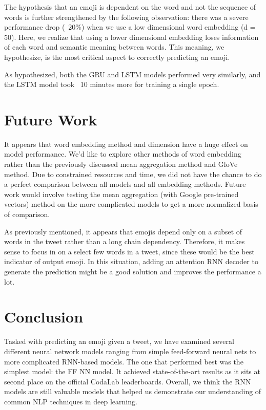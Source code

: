 \documentclass[11pt,a4paper]{article}
\begin{document}
	The hypothesis that an emoji is dependent on the word and not the sequence of words is further strengthened by the following observation: there was a severe performance drop (~20\%) when we use a low dimensional word embedding (d = 50). Here, we realize that using a lower dimensional embedding loses information of each word and semantic meaning between words. This meaning, we hypothesize, is the most critical aspect to correctly predicting an emoji.
	\par
	As hypothesized, both the GRU and LSTM models performed very similarly, and the LSTM model took ~10 minutes more for training a single epoch. 
\section{Future Work}
It appears that word embedding method and dimension have a huge effect on model performance. We’d like to explore other methods of word embedding rather than the previously discussed mean aggregation method and GloVe method. Due to constrained resources and time, we did not have the chance to do a perfect comparison between all models and all embedding methods. Future work would involve testing the mean aggregation (with Google pre-trained vectors) method on the more complicated models to get a more normalized basis of comparison.
\par
As previously mentioned, it appears that emojis depend only on a subset of words in the tweet rather than a long chain dependency. Therefore, it makes sense to focus in on a select few words in a tweet, since these would be the best indicator of output emoji. In this situation, adding an attention RNN decoder to generate the prediction might be a good solution and improves the performance a lot. 

\section{Conclusion}
Tasked with predicting an emoji given a tweet, we have examined several different neural network models ranging from simple feed-forward neural nets to more complicated RNN-based models. The one that performed best was the simplest model: the FF NN model. It achieved state-of-the-art results as it sits at second place on the official CodaLab leaderboards. Overall, we think the RNN models are still valuable models that helped us demonstrate our understanding of common NLP techniques in deep learning.

	

%
%
\nocite{*}





\appendix


	
\end{document}
